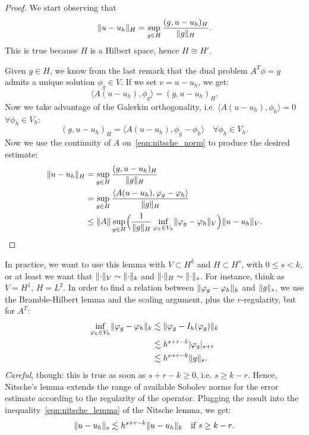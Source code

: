 \begin{proof}
We start observing that
\begin{equation}\label{eqn:nitsche_norm}
\lVert u-u_h\rVert_H = \sup_{g \in H} \frac{(g, u-u_h)_H}{\lVert g\rVert_H}.
\end{equation}
This is true because $H$ is a Hilbert space, hence $H \cong H'$.

Given $g \in H$, we know from the last remark that the dual problem $A^T \phi = g$ admits a unique solution $\phi_g \in V$. If we set $v = u-u_h$, we get:
\[
\langle A (u-u_h),\phi_g \rangle = (g, u-u_h)_H.
\]
Now we take advantage of the Galerkin orthogonality, i.e. $\langle A (u-u_h), \phi_h \rangle = 0$ $\forall \phi_h \in V_h$:
\[
(g, u-u_h)_H = \langle A (u-u_h),\phi_g - \phi_h \rangle \quad \forall \phi_h \in V_h.
\]
Now we use the continuity of $A$ on~\eqref{eqn:nitsche_norm} to produce the desired estimate:
\begin{align}
\lVert u-u_h\rVert_H &= \sup_{g \in H} \frac{(g, u-u_h)_H}{\lVert g\rVert_H} \\
& = \sup_{g \in H} \frac{\langle A (u-u_h),\varphi_g - \varphi_h \rangle}{\lVert g\rVert_H} \\
& \le \lVert A\rVert \sup_{g \in H} \Bigl( \frac{1}{\lVert g\rVert_H} \inf_{\varphi_h \in V_h} \lVert\varphi_g - \varphi_h\rVert_V \Bigr)
\lVert u-u_h\rVert_V .
\end{align}
\end{proof}

In practice, we want to use this lemma with $V \subset H^k$ and $H \subset H^s$, with $0\le s < k$, or at least we want that $\lVert\cdot\rVert_V \sim \lVert\cdot\rVert_k$ and $\lVert\cdot\rVert_H \sim \lVert\cdot\rVert_s$. For instance, think as $V=H^1$, $H=L^2$.
In order to find a relation between $\lVert\varphi_g - \varphi_h\rVert_k$ and $\lVert g\rVert_s$, we use the Bramble-Hilbert lemma and the scaling argument, plus the $r$-regularity, but for $A^T$:
\begin{align}
\inf_{\varphi_h \in V_h} \lVert\varphi_g - \varphi_h\rVert_k &\lesssim \lVert\varphi_g - I_h(\varphi_g)\rVert_k  \\
&\lesssim h^{s+r-k} \lvert\varphi_g\rvert_{s+r}  \\
&\lesssim h^{s+r-k} \lVert g\rVert_s.
\end{align}
\emph{Careful}, though: this is true as soon as $s+r-k \ge 0$, i.e. $s \ge k-r$. Hence, Nitsche's lemma extends the range of available Sobolev norms for the error estimate according to the regularity of the operator. Plugging the result into the inequality~\eqref{eqn:nitsche_lemma} of the Nitsche lemma, we get:
\[
\lVert u-u_h\rVert_s \lesssim h^{s+r-k} \lVert u-u_h\rVert_k \quad \text{if $s \ge k-r$}.
\]

